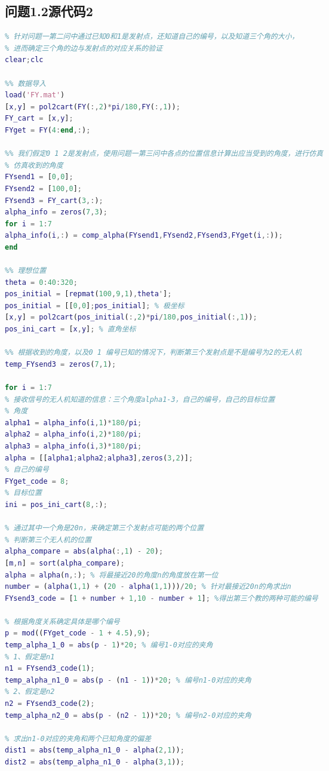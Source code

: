 \documentclass[12pt]{ctexart}
\begin{document}
\begin{spacing}{1.5}
\section{问题1.2源代码2}
\begin{lstlisting}[title="shumo\_B\_22\_test.m",language=matlab]
%% 问题一第二问验证
% 针对问题一第二问中通过已知0和1是发射点，还知道自己的编号，以及知道三个角的大小，
% 进而确定三个角的边与发射点的对应关系的验证
clear;clc

%% 数据导入
load('FY.mat')
[x,y] = pol2cart(FY(:,2)*pi/180,FY(:,1));
FY_cart = [x,y];
FYget = FY(4:end,:);

%% 我们假定0 1 2是发射点，使用问题一第三问中各点的位置信息计算出应当受到的角度，进行仿真
% 仿真收到的角度
FYsend1 = [0,0];
FYsend2 = [100,0];
FYsend3 = FY_cart(3,:);
alpha_info = zeros(7,3);
for i = 1:7
alpha_info(i,:) = comp_alpha(FYsend1,FYsend2,FYsend3,FYget(i,:));
end

%% 理想位置
theta = 0:40:320;
pos_initial = [repmat(100,9,1),theta'];
pos_initial = [[0,0];pos_initial]; % 极坐标
[x,y] = pol2cart(pos_initial(:,2)*pi/180,pos_initial(:,1));
pos_ini_cart = [x,y]; % 直角坐标

%% 根据收到的角度，以及0 1 编号已知的情况下，判断第三个发射点是不是编号为2的无人机
temp_FYsend3 = zeros(7,1);

for i = 1:7
% 接收信号的无人机知道的信息：三个角度alpha1-3，自己的编号，自己的目标位置
% 角度
alpha1 = alpha_info(i,1)*180/pi;
alpha2 = alpha_info(i,2)*180/pi;
alpha3 = alpha_info(i,3)*180/pi;
alpha = [[alpha1;alpha2;alpha3],zeros(3,2)];
% 自己的编号
FYget_code = 8;
% 目标位置
ini = pos_ini_cart(8,:);

% 通过其中一个角是20n，来确定第三个发射点可能的两个位置
% 判断第三个无人机的位置
alpha_compare = abs(alpha(:,1) - 20);
[m,n] = sort(alpha_compare);
alpha = alpha(n,:); % 将最接近20的角度n的角度放在第一位
number = (alpha(1,1) + (20 - alpha(1,1)))/20; % 针对最接近20n的角求出n
FYsend3_code = [1 + number + 1,10 - number + 1]; %得出第三个教的两种可能的编号

% 根据角度关系确定具体是哪个编号
p = mod((FYget_code - 1 + 4.5),9);
temp_alpha_1_0 = abs(p - 1)*20; % 编号1-0对应的夹角
% 1、假定是n1
n1 = FYsend3_code(1);
temp_alpha_n1_0 = abs(p - (n1 - 1))*20; % 编号n1-0对应的夹角
% 2、假定是n2
n2 = FYsend3_code(2);
temp_alpha_n2_0 = abs(p - (n2 - 1))*20; % 编号n2-0对应的夹角

% 求出n1-0对应的夹角和两个已知角度的偏差
dist1 = abs(temp_alpha_n1_0 - alpha(2,1));
dist2 = abs(temp_alpha_n1_0 - alpha(3,1));


\end{lstlisting}
\end{spacing}
\end{document}
